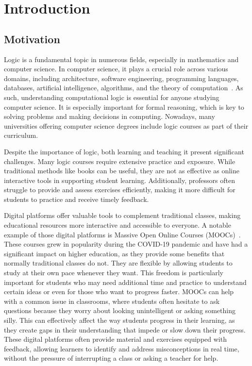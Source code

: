 
%

\chapter{Introduction}

\section{Motivation}
Logic is a fundamental topic in numerous fields, especially in mathematics and computer science. In computer science, it plays a crucial role across various domains, including architecture, software engineering, programming languages, databases, artificial intelligence, algorithms, and the theory of computation~\cite{bruce_panel}. As such, understanding computational logic is essential for anyone studying computer science. It is especially important for formal reasoning, which is key to solving problems and making decisions in computing. Nowadays, many universities offering computer science degrees include logic courses as part of their curriculum.

Despite the importance of logic, both learning and teaching it present significant challenges. Many logic courses require extensive practice and exposure. While traditional methods like books can be useful, they are not as effective as online interactive tools in supporting student learning. Additionally, professors often struggle to provide and assess exercises efficiently, making it more difficult for students to practice and receive timely feedback.

Digital platforms offer valuable tools to complement traditional classes, making educational resources more interactive and accessible to everyone. A notable example of those digital platforms is Massive Open Online Courses (MOOCs)~\cite{alhazzani_2020_moocs}. These courses grew in popularity during the COVID-19 pandemic and have had a significant impact on higher education, as they provide some benefits that normally traditional classes do not. They are flexible by allowing students to study at their own pace whenever they want. This freedom is particularly important for students who may need additional time and practice to understand certain ideas or even for those who want to progress faster. MOOCs can help with a common issue in classrooms, where students often hesitate to ask questions because they worry about looking unintelligent or asking something silly. This can effectively affect the way students progress in their learning, as they create gaps in their understanding that impede or slow down their progress. These digital platforms often provide material and exercises equipped with feedback, allowing learners to identify and address misconceptions in real time, without the pressure of interrupting a class or asking a teacher for help.

